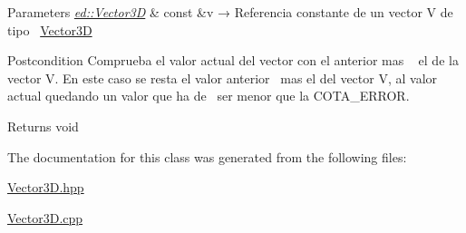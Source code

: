 \begin{DoxyParams}{Parameters}
{\em \mbox{\hyperlink{classed_1_1Vector3D}{ed\+::\+Vector3D}}} & const \&v → Referencia constante de un vector V de tipo~\newline
 \mbox{\hyperlink{classed_1_1Vector3D}{Vector3D}}\\
\hline
\end{DoxyParams}
\begin{DoxyPostcond}{Postcondition}
Comprueba el valor actual del vector con el anterior mas ~\newline
 el de la vector V. En este caso se resta el valor anterior~\newline
 mas el del vector V, al valor actual quedando un valor que ha de~\newline
 ser menor que la C\+O\+T\+A\+\_\+\+E\+R\+R\+OR.
\end{DoxyPostcond}
\begin{DoxyReturn}{Returns}
void 
\end{DoxyReturn}


The documentation for this class was generated from the following files\+:\begin{DoxyCompactItemize}
\item 
\mbox{\hyperlink{Vector3D_8hpp}{Vector3\+D.\+hpp}}\item 
\mbox{\hyperlink{Vector3D_8cpp}{Vector3\+D.\+cpp}}\end{DoxyCompactItemize}
